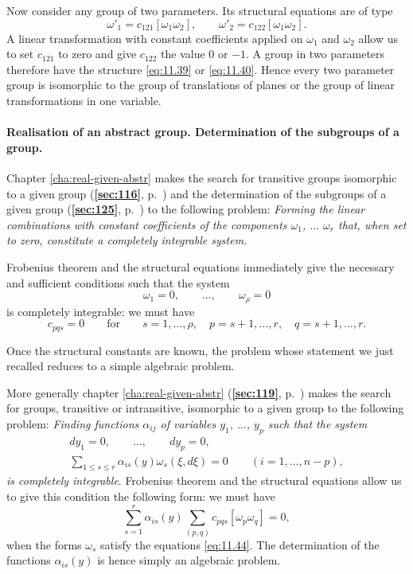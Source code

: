 \documentclass[leqno,11pt]{book}
\numberwithin{equation}{chapter}
\theoremstyle{shape1}
\theoremstyle{shapesmall}
\newcommand{\fsref}[1]{{\rm\textsection\textbf{\ref{sec:#1}}}}
\begin{document}
Now consider any group of two parameters. Its structural equations are of type
\begin{equation}
  \label{eq:11.41}
  \omega'_{1}=c_{121}[\omega_{1}\omega_{2}],\qquad\omega'_{2}=c_{122}[\omega_{1}\omega_{2}].
\end{equation}
A linear transformation with constant coefficients applied on $\omega_{1}$ and $\omega_{2}$ allow us to set $c_{121}$ to zero and give $c_{122}$ the value $0$ or $-1$. A group in two parameters therefore have the structure \eqref{eq:11.39} or \eqref{eq:11.40}. Hence every two parameter group is isomorphic to the group of translations of planes or the group of linear transformations in one variable.

\paragraph{Realisation of an abstract group. Determination of the subgroups of a group.}
\label{sec:169}
Chapter \ref{cha:real-given-abstr} makes the search for transitive groups isomorphic to a given group (\fsref{116}, p.~\pageref{sec:116}) and the determination of the subgroups of a given group (\fsref{125}, p.~\pageref{sec:125}) to the following problem: \emph{Forming the linear combinations with constant coefficients of the components $\omega_{1}$, $\dots$ $\omega_{r}$ that, when set to zero, constitute a completely integrable system.}

Frobenius theorem and the structural equations immediately give the necessary and sufficient conditions such that the system 
\[
\omega_{1}=0,\qquad\dots,\qquad\omega_{\rho}=0
\]
is completely integrable: we must have
\begin{equation}
  \label{eq:11.42}
  c_{pqs}=0\qquad\text{for}\qquad s=1,\dots,\rho,\quad p=s+1,\dots,r,\quad q=s+1,\dots,r.
\end{equation}

Once the structural constants are known, the problem whose statement we just recalled reduces to a simple algebraic problem.

More generally chapter \ref{cha:real-given-abstr} (\fsref{119}, p.~\pageref{sec:119}) makes the search for groups, transitive or intransitive, isomorphic to a given group to the following problem: \emph{Finding functions $\alpha_{ij}$ of variables $y_{1}$, $\dots$, $y_{p}$ such that the system}
\begin{gather}
  \label{eq:11.43}
  dy_{1}=0,\qquad\dots,\qquad dy_{p}=0,
  \\
  \label{eq:11.44}
  \sum_{1\le s\le r}\alpha_{is}(y)\omega_{s}(\xi,d\xi)=0\qquad(i=1,\dots,n-p),
\end{gather}
\emph{is completely integrable}. Frobenius theorem and the structural equations allow us to give this condition the following form: we must have
\begin{equation}
  \label{eq:11.55}
  \sum_{s=1}^{r}\alpha_{is}(y)\sum_{(p,q)}c_{pqs}[\omega_{p}\omega_{q}]=0,
\end{equation}
when the forms $\omega_{s}$ satisfy the equations \eqref{eq:11.44}. The determination of the functions $\alpha_{is}(y)$ is hence simply an algebraic problem.
\end{document}

